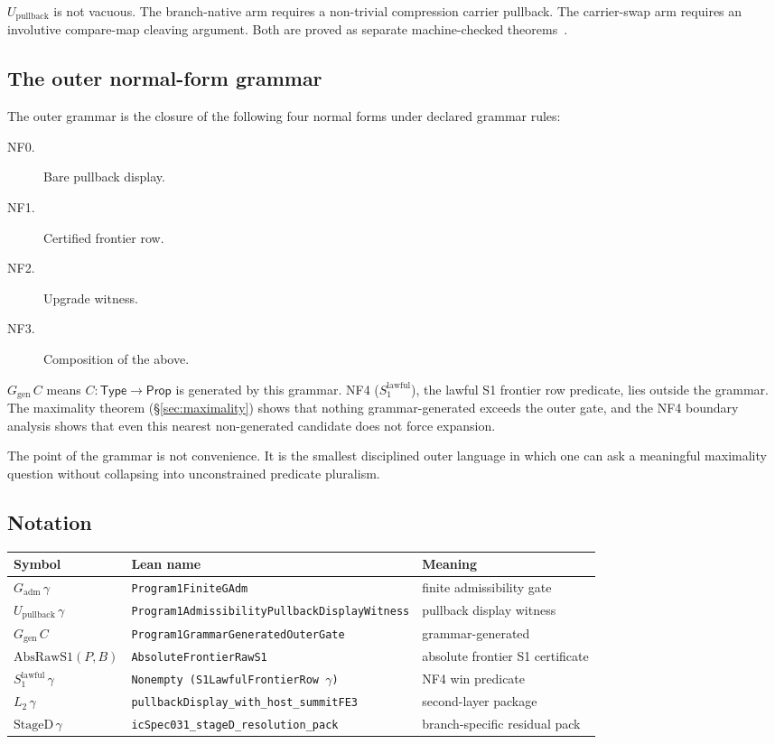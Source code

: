 \documentclass[11pt]{article}
\theoremstyle{plain}
\theoremstyle{definition}
\theoremstyle{remark}
\newcommand{\Gadm}{G_{\mathrm{adm}}}
\newcommand{\Upb}{U_{\mathrm{pullback}}}
\newcommand{\Ggen}{G_{\mathrm{gen}}}
\newcommand{\AbsRawSone}{\mathrm{AbsRawS1}}
\newcommand{\Stwo}{L_2}
\newcommand{\StageD}{\mathrm{StageD}}
\newcommand{\SoneLawful}{S_1^{\mathrm{lawful}}}
\newcommand{\lean}[1]{\texttt{\small #1}}
\begin{document}
$\Upb$ is not vacuous.  The branch-native arm requires a non-trivial
compression carrier pullback.  The carrier-swap arm requires an
involutive compare-map cleaving argument.  Both are proved as separate
machine-checked theorems~\cite{SpivackAdequacy}.

\subsection{The outer normal-form grammar}

The outer grammar is the closure of the following four normal forms under
declared grammar rules:
\begin{description}
  \item[NF0.] Bare pullback display.
  \item[NF1.] Certified frontier row.
  \item[NF2.] Upgrade witness.
  \item[NF3.] Composition of the above.
\end{description}
$\Ggen\,C$ means $C : \mathsf{Type} \to \mathsf{Prop}$ is
generated by this grammar.  NF4 ($\SoneLawful$), the lawful S1 frontier
row predicate, lies outside the grammar.  The maximality theorem
(\S\ref{sec:maximality}) shows that nothing grammar-generated exceeds
the outer gate, and the NF4 boundary analysis shows that even this
nearest non-generated candidate does not force expansion.

The point of the grammar is not convenience.  It is the smallest disciplined
outer language in which one can ask a meaningful maximality question without
collapsing into unconstrained predicate pluralism.

\subsection{Notation}

\begin{center}
\footnotesize
\setlength{\tabcolsep}{3.5pt}
\begin{tabular}{lll}
\hline
Symbol & Lean name & Meaning \\
\hline
$\Gadm\,\gamma$ & \lean{Program1FiniteGAdm} & finite admissibility gate \\
$\Upb\,\gamma$ & \lean{Program1AdmissibilityPullbackDisplayWitness} & pullback display witness \\
$\Ggen\,C$ & \lean{Program1GrammarGeneratedOuterGate} & grammar-generated \\
$\AbsRawSone(P,B)$ & \lean{AbsoluteFrontierRawS1} & absolute frontier S1 certificate \\
$\SoneLawful\,\gamma$ & \lean{Nonempty (S1LawfulFrontierRow $\gamma$)} & NF4 win predicate \\
$\Stwo\,\gamma$ & \lean{pullbackDisplay\_with\_host\_summitFE3} & second-layer package \\
$\StageD\,\gamma$ & \lean{icSpec031\_stageD\_resolution\_pack} & branch-specific residual pack \\
\hline
\end{tabular}
\end{center}
\end{document}
